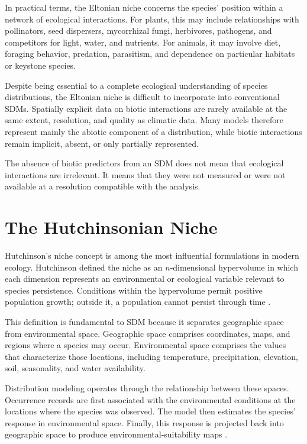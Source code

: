 In practical terms, the Eltonian niche concerns the species' position within a
network of ecological interactions. For plants, this may include relationships
with pollinators, seed dispersers, mycorrhizal fungi, herbivores, pathogens, and
competitors for light, water, and nutrients. For animals, it may involve diet,
foraging behavior, predation, parasitism, and dependence on particular habitats
or keystone species.

Despite being essential to a complete ecological understanding of species
distributions, the Eltonian niche is difficult to incorporate into conventional
SDMs. Spatially explicit data on biotic interactions are rarely available at
the same extent, resolution, and quality as climatic data. Many models therefore
represent mainly the abiotic component of a distribution, while biotic
interactions remain implicit, absent, or only partially represented.

\begin{atencao}[title={\faExclamationTriangle\quad Attention}]
The absence of biotic predictors from an SDM does not mean that ecological
interactions are irrelevant. It means that they were not measured or were not
available at a resolution compatible with the analysis.
\end{atencao}

\section{The Hutchinsonian Niche}

Hutchinson's niche concept is among the most influential formulations in modern
ecology. Hutchinson defined the niche as an $n$-dimensional hypervolume in which
each dimension represents an environmental or ecological variable relevant to
species persistence. Conditions within the hypervolume permit positive
population growth; outside it, a population cannot persist through time
\parencite{hutchinson1957,colwell2009}.

This definition is fundamental to SDM because it separates geographic space
from environmental space. Geographic space comprises coordinates, maps, and
regions where a species may occur. Environmental space comprises the values
that characterize those locations, including temperature, precipitation,
elevation, soil, seasonality, and water availability.

Distribution modeling operates through the relationship between these spaces.
Occurrence records are first associated with the environmental conditions at
the locations where the species was observed. The model then estimates the
species' response in environmental space. Finally, this response is projected
back into geographic space to produce environmental-suitability maps
\parencite{guisan2017habitat,raes2018modeling}.

